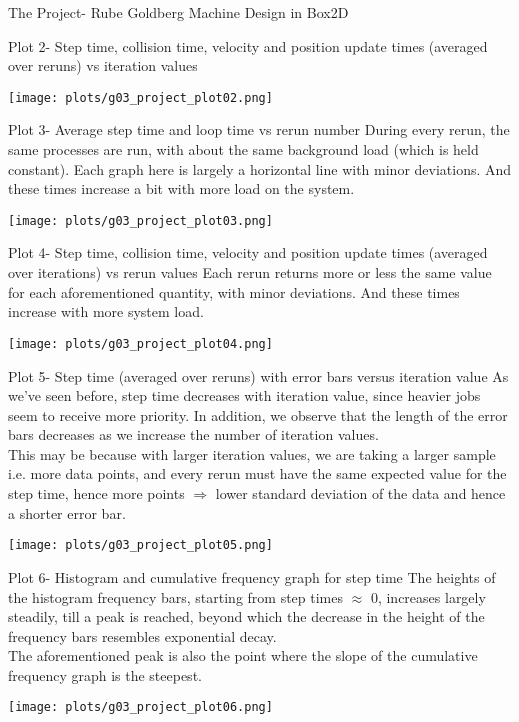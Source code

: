 \documentclass[a4paper,11pt]{article}
\begin{document}
\begin{section}{The Project- Rube Goldberg Machine Design in Box2D}
\begin{subsection}{Plot 2- Step time, collision time, velocity and position update times (averaged over reruns) vs iteration values}
\begin{center}\texttt{[image: plots/g03\_project\_plot02.png]}\end{center}
\end{subsection}
\begin{subsection}{Plot 3- Average step time and loop time vs rerun number}
During every rerun, the same processes are run, with about the same background load (which is held constant). Each graph here is largely a horizontal line with minor deviations. And these times increase a bit with more load on the system.
\begin{center}\texttt{[image: plots/g03\_project\_plot03.png]}\end{center}
\end{subsection}
\begin{subsection}{Plot 4- Step time, collision time, velocity and position update times (averaged over iterations) vs rerun values}
Each rerun returns more or less the same value for each aforementioned quantity, with minor deviations. And these times increase with more system load.
\begin{center}\texttt{[image: plots/g03\_project\_plot04.png]}\end{center}
\end{subsection}
\begin{subsection}{Plot 5- Step time (averaged over reruns) with error bars versus iteration value}
As we've seen before, step time decreases with iteration value, since heavier jobs seem to receive more priority. In addition, we observe that the length of the error bars decreases as we increase the number of iteration values.\\This may be because with larger iteration values, we are taking a larger sample i.e. more data points, and every rerun must have the same expected value for the step time, hence more points \(\Rightarrow\) lower standard deviation of the data and hence a shorter error bar.
\begin{center}\texttt{[image: plots/g03\_project\_plot05.png]}\end{center}
\end{subsection}
\begin{subsection}{Plot 6- Histogram and cumulative frequency graph for step time}
The heights of the histogram frequency bars, starting from step times \(\approx\) 0, increases largely steadily, till a peak is reached, beyond which the decrease in the height of the frequency bars resembles exponential decay.\\The aforementioned peak is also the point where the slope of the cumulative frequency graph is the steepest.
\begin{center}\texttt{[image: plots/g03\_project\_plot06.png]}\end{center}
\end{subsection}
\end{section}


\end{document}
